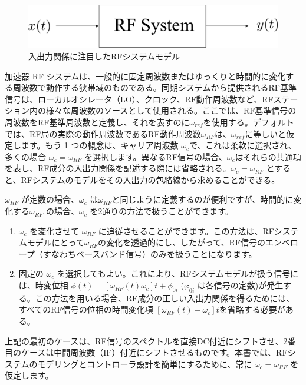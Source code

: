 \documentclass[book]{jlreq}
\begin{document}
\begin{figure}[hbt]
    \begin{center}
      \includegraphics[width=12cm,clip]{figs/Fig3.1.pdf}
      \caption{入出力関係に注目したRFシステムモデル}
     \label{Fig3.1}
    \end{center}
\end{figure}

加速器 RF システムは、一般的に固定周波数またはゆっくりと時間的に変化する周波数で動作する狭帯域のものである。同期システムから提供されるRF基準信号は、ローカルオシレータ（LO）、クロック、RF動作周波数など、RFステーション内の様々な周波数のソースとして使用される。ここでは、RF基準信号の周波数をRF基準周波数と定義し、それを表すのに$\omega_{ref}$を使用する。デフォルトでは、RF局の実際の動作周波数であるRF動作周波数$\omega_{RF}$は、$\omega_{ref}$に等しいと仮定します。もう 1 つの概念は、キャリア周波数 $\omega_{c}$で、これは柔軟に選択され、多くの場合 $\omega_c = \omega_{RF}$ を選択します。異なるRF信号の場合、$\omega_c$はそれらの共通項を表し、RF成分の入出力関係を記述する際には省略される。$\omega_c = \omega_{RF}$ とすると、RFシステムのモデルをその入出力の包絡線から求めることができる。

$\omega_{RF}$ が定数の場合、$\omega_c$ は$\omega_{RF}$と同じように定義するのが便利ですが、時間的に変化する$\omega_{RF}$ の場合、$\omega_c$ を2通りの方法で扱うことができます。

\begin{enumerate}
    \item $\omega_c$ を変化させて $\omega_{RF}$ に追従させることができます。この方法は、RFシステムモデルにとって$\omega_{RF}$の変化を透過的にし、したがって、RF信号のエンベロープ（すなわちベースバンド信号）のみを扱うことになります。
    \item 固定の $\omega_c$ を選択してもよい。これにより、RFシステムモデルが扱う信号には、時変位相 $\phi (t) = [\omega_{RF} (t)\omega_{c}]t + \phi_{0i}$ ($\varphi_{0i}$ は各信号の定数)が発生する。この方法を用いる場合、RF成分の正しい入出力関係を得るためには、すべてのRF信号の位相の時間変化項 $[\omega_{RF}(t) - \omega_{c}]t$を省略する必要がある。
\end{enumerate}

上記の最初のケースは、RF信号のスペクトルを直接DC付近にシフトさせ、2番目のケースは中間周波数（IF）付近にシフトさせるものです。本書では、RFシステムのモデリングとコントローラ設計を簡単にするために、常に $\omega_c = \omega_{RF}$ を仮定します。
\end{document}
